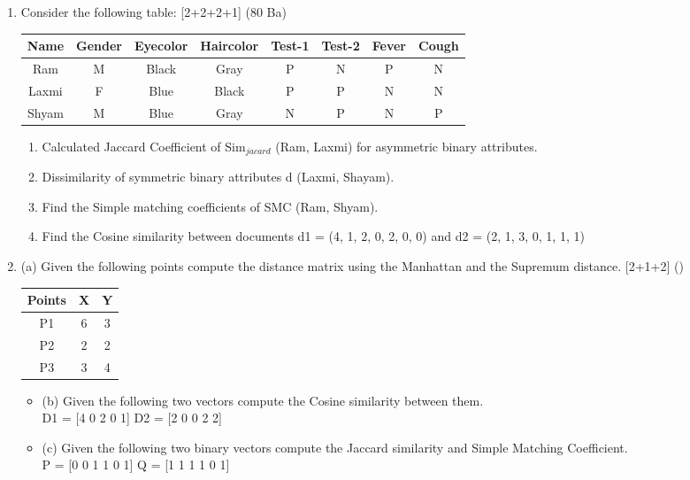 \documentclass[12pt]{article}
\begin{document}
\begin{enumerate}[topsep=0pt, noitemsep]
      \item Consider the following table: \hfill [2+2+2+1] (80 Ba)\\
        \small
        \begin{tabular}{|c|c|c|c|c|c|c|c|}
          \hline
          Name & Gender & Eyecolor & Haircolor & Test-1 & Test-2 & Fever & Cough \\ \hline
          Ram & M & Black & Gray & P & N & P & N \\ \hline
          Laxmi & F & Blue & Black & P & P & N & N \\ \hline
          Shyam & M & Blue & Gray & N & P & N & P \\ \hline
        \end{tabular}
        \normalsize
        \begin{enumerate}[label=\roman*),topsep=2pt,noitemsep]
          \item Calculated Jaccard Coefficient of Sim$_{jacard}$ (Ram, Laxmi) for asymmetric binary attributes.
          \item Dissimilarity of symmetric binary attributes d (Laxmi, Shayam).
          \item Find the Simple matching coefficients of SMC (Ram, Shyam).
          \item Find the Cosine similarity between documents d1 = (4, 1, 2, 0, 2, 0, 0) and d2 = (2, 1, 3, 0, 1, 1, 1)
        \end{enumerate}

      \item (a) Given the following points compute the distance matrix using the Manhattan and the Supremum distance. \hfill [2+1+2] ()\\
        \small
        \begin{tabular}{|c|c|c|}
          \hline
          Points & X & Y \\ \hline
          P1 & 6 & 3 \\ \hline
          P2 & 2 & 2 \\ \hline
          P3 & 3 & 4 \\ \hline
        \end{tabular}
        \normalsize
        \begin{itemize}[topsep=2pt,noitemsep,label={}]
          \item (b) Given the following two vectors compute the Cosine similarity between them.\\
            D1 = [4 0 2 0 1] \qquad D2 = [2 0 0 2 2]
          \item (c) Given the following two binary vectors compute the Jaccard similarity and Simple Matching Coefficient.\\
            P = [0 0 1 1 0 1] \qquad Q = [1 1 1 1 0 1]
        \end{itemize}


\end{enumerate}
\end{document}
